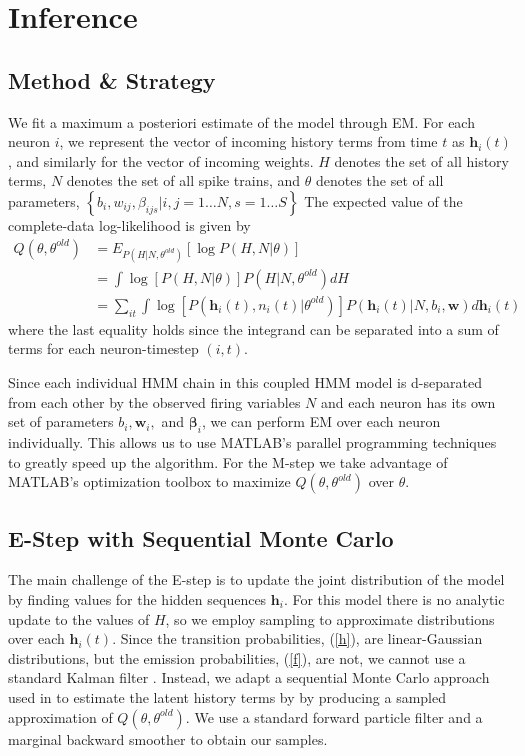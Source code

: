 \documentclass{article}
\begin{document}
\section{Inference}
\subsection{Method \& Strategy}
We fit a maximum a posteriori estimate of the model through EM.  For
each neuron $i$, we represent the vector of incoming history terms from
time $t$ as $\mathbf{h}_i(t)$, and similarly for the vector of
incoming weights. $H$ denotes the set of all history terms, $N$
denotes the set of all spike trains, and $\theta$ denotes the set
of all parameters,
$\left\{ b_i, w_{ij}, \beta_{ijs} | i,j = 1 \ldots N, s = 1 \ldots S \right\}$
The expected value of the complete-data log-likelihood is given by
\begin{align*} \label{Q}  
Q(\theta,\theta^{old}) &= E_{P(H|N,\theta^{old})} \left[ \log{P(H,N|\theta)} \right] 
\\                     &= \int{ \log\left[P(H,N|\theta)\right] P(H|N,\theta^{old}) dH }
\\                     &= \sum_{it} \int \log\left[P(\mathbf{h}_i(t),n_i(t)|\theta^{old})\right] P(\mathbf{h}_i(t)|N,b_i,\mathbf{w}) d\mathbf{h}_i(t)
\end{align*}
where the last equality holds since the integrand can be separated
into a sum of terms for each neuron-timestep $(i,t)$.

Since each individual HMM chain in this coupled HMM model is d-separated from each other by the observed firing variables $N$ and each neuron has its own set of parameters  $b_i, \mathbf w_i,$ and $\bm{\beta}_i$, we can perform EM over each neuron individually. This allows us to use MATLAB's parallel programming techniques to greatly speed up the algorithm. For the M-step we take advantage of MATLAB's optimization toolbox to maximize $Q(\theta,\theta^{old})$ over $\theta$.

\subsection{E-Step with Sequential Monte Carlo}

The main challenge of the E-step is to update the joint distribution of the model by finding values for the hidden sequences $\mathbf{h}_i$. For this model there is no analytic update to the values of $H$, so we employ sampling to approximate distributions over each $\mathbf{h}_i(t)$. Since the transition probabilities, (\ref{h}), are linear-Gaussian distributions,
but the emission probabilities, (\ref{f}), are not, we cannot
use a standard Kalman filter \citep{bishop2006}.  Instead, we adapt a
sequential Monte Carlo approach used in \citep{vogelstein2009,
mishchencko2011} to estimate the latent history terms by
by producing a sampled approximation of $Q(\theta,\theta^{old})$. We
use a standard forward particle filter \citep{bishop2006} and a marginal
backward smoother \citep{doucet2000} to obtain our samples.
\end{document}

